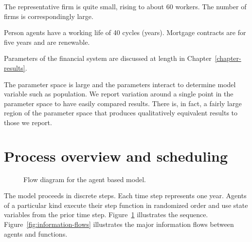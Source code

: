 The representative firm is quite small, rising to about 60 workers. The number of firms is correspondingly large. 

Person agents have a working life of 40 cycles (years). Mortgage contracts are  for five years and are renewable.

Parameters of the financial system are discussed at length in Chapter~\ref{chapter-results}. 

 The parameter space is large and the parameters interact to determine model variable such as population. We report variation around a single point in the parameter space to have easily compared results. There is, in fact, a fairly large region of the parameter space that produces qualitatively equivalent results to those we report. 

\section{Process overview and scheduling}


\begin{figure}[h!tb]
\centering \vspace{-2cm}
 
\caption[Flow diagram for the agent based model]{Flow diagram for the agent based model.} \label{fig:computational-sequence}
\end{figure}


The model proceeds in discrete steps. Each time step represents one year. Agents of a particular kind execute their step function in randomized order and use state variables from the prior time step. Figure~\ref{fig:computational-sequence} illustrates the sequence. Figure~\ref{fig:information-flows} illustrates the major information flows between agents and functions.



